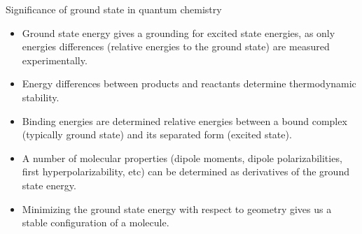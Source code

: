 \begin{frame}{Significance of ground state in quantum chemistry}
  \begin{itemize}
    \setlength\itemsep{0.1em}
    \item Ground state energy gives a grounding for excited state energies, as only energies differences (relative energies to the ground state) are measured experimentally.
    \item Energy differences between products and reactants determine thermodynamic stability.
    \item Binding energies are determined relative energies between a bound complex (typically ground state) and its separated form (excited state).
    \item A number of molecular properties (dipole moments, dipole polarizabilities, first hyperpolarizability, etc)
          can be determined as derivatives of the ground state energy.
    \item Minimizing the ground state energy with respect to geometry gives us a stable configuration of a molecule.
  \end{itemize}
\end{frame}

